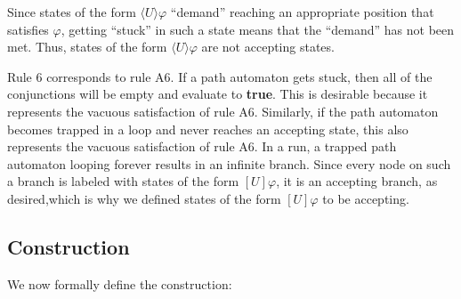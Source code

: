\documentclass{lmcs}
\theoremstyle{definition}
\newcommand{\dbox}[1]{\langle #1 \rangle}
\newcommand{\bbox}[1]{[ #1 ]}
\DeclareMathOperator{\?}{?}
\begin{document}
Since states of the form $\dbox{U}\varphi$ ``demand'' reaching an appropriate position that satisfies $\varphi$, getting ``stuck'' in such a state means that the ``demand'' has not been met. Thus, states of the form $\dbox{U}\varphi$ are not accepting states.

Rule 6 corresponds to rule A6. If a path automaton gets stuck, then all of the conjunctions will be empty and evaluate to \textbf{true}. This is desirable because it represents the vacuous satisfaction of rule A6. Similarly, if the path automaton becomes trapped in a loop and never reaches an accepting state, this also represents the vacuous satisfaction of rule A6. In a run, a trapped path automaton looping forever results in an infinite branch. Since every node on such a branch is labeled with states of the form $\bbox{U}\varphi$, it is an accepting branch, as desired,which is why we defined states of the form $\bbox{U}\varphi$ to be accepting.

\subsection{Construction}

We now formally define the construction:
\end{document}
